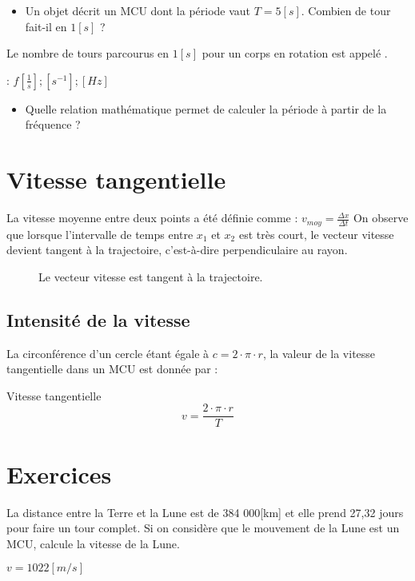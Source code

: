 \begin{itemize}[label=\(\rightarrow\)]
      \item Un objet décrit un MCU dont la période vaut \(T=5[s]\). Combien de tour fait-il en \(1[s]\) ?
\end{itemize}
Le nombre de tours parcourus en \(1[s]\) pour un corps en rotation est appelé .
\begin{encadre}
       : \(f [\frac{1}{s}] ; [s^{-1}] ; [Hz]\)
\end{encadre}

\begin{itemize}[label=\(\rightarrow\)]
      \item Quelle relation mathématique permet de calculer la période à partir de la fréquence ?
\end{itemize}

\newpage

\section{Vitesse tangentielle}
La vitesse moyenne entre deux points a été définie comme :
\(v_{moy}=\frac{\Delta x}{\Delta t}\)
On observe que lorsque l'intervalle de temps entre \(x_1\) et \(x_2\) est très court, le vecteur vitesse devient tangent à la trajectoire, c'est-à-dire perpendiculaire au rayon.


\begin{figure}[h!]
      \centering
      
      \caption{Le vecteur vitesse est tangent à la trajectoire.}
      \label{vitesse_tangentielle}
\end{figure}

\subsection{Intensité de la vitesse}
La circonférence d'un cercle étant égale à \(c=2 \cdot \pi \cdot r\), la valeur de la vitesse tangentielle dans un MCU est donnée par :
\begin{mytheo*}{Vitesse tangentielle}
      \begin{equation}
            v=\frac{2 \cdot \pi \cdot r}{T}
      \end{equation}
\end{mytheo*}


\newpage

\section{Exercices}
\begin{exercise}
      La distance entre la Terre et la Lune est de 384 000[km] et elle prend 27,32 jours pour faire un tour complet. Si on considère que le mouvement de la Lune est un MCU, calcule la vitesse de la Lune.
\end{exercise}
\begin{solution}
      \(v=1022[m/s]\)
\end{solution}

